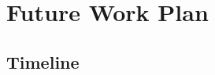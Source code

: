 \chapter{Future Work Plan}

\ifpdf
    \graphicspath{{Chapter5/Figs/Raster/}{Chapter5/Figs/PDF/}{Chapter5/Figs/}}
\else
    \graphicspath{{Chapter5/Figs/Vector/}{Chapter5/Figs/}}
\fi

\section{Timeline}